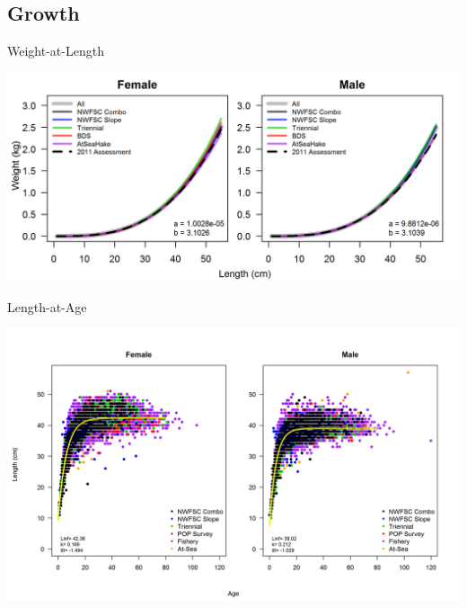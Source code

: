 \documentclass[pdf]{beamer}\usepackage[]{graphicx}\usepackage[]{color}
\begin{document}
\subsection{Growth}
\begin{frame}{Weight-at-Length}
  \begin{center}
    \includegraphics[scale = 0.75]{figures/weightAtLengthPred.png}
  \end{center}
\end{frame}

\begin{frame}{Length-at-Age}
  \begin{center}
  \includegraphics[scale = 0.45]{figures/LengthAgeAll_2.png}
  \end{center}
\end{frame}
\end{document}
